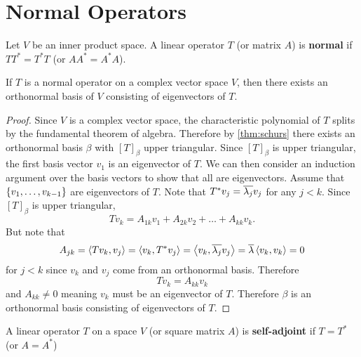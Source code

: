 \documentclass{subfiles}
\begin{document}
\section{Normal Operators}

\begin{definition}
    Let $V$ be an inner product space. A linear operator $T$ (or matrix $A$) is \textbf{normal} if $T T^* = T^* T$ (or $A A^* = A^* A$).
\end{definition}

\begin{theorem}
    If $T$ is a normal operator on a complex vector space $V$, then there exists an orthonormal basis of $V$ consisting of eigenvectors of $T$.
\end{theorem}

\begin{proof}
    Since $V$ is a complex vector space, the characteristic polynomial of $T$ splits by the fundamental theorem of algebra. Therefore by \ref{thm:schurs} there exists an orthonormal basis $\beta$ with $[T]_\beta$ upper triangular. Since $[T]_{\beta}$ is upper triangular, the first basis vector $v_1$ is an eigenvector of $T$. We can then consider an induction argument over the basis vectors to show that all are eigenvectors. Assume that $\qty{v_1, \ldots, v_{k-1}}$ are eigenvectors of $T$. Note that $T^* v_j = \overline{\lambda_j} v_j$ for any $j < k$. Since $[T]_{\beta}$ is upper triangular,
    \[
        T v_k = A_{1k} v_1 + A_{2k} v_2 + \ldots + A_{kk} v_k
    .\]
    But note that
    \[
        A_{jk} = \left\langle T v_k, v_j \right\rangle = \left\langle v_k, T^* v_j \right\rangle = \left\langle v_k, \overline{\lambda_j} v_j \right\rangle = \overline{\lambda} \left\langle v_k, v_k \right\rangle = 0
    \]
    for $j < k$ since $v_k$ and $v_j$ come from an orthonormal basis. Therefore
    \[
        T v_k = A_{kk} v_k
    \]
    and $A_{kk} \neq 0$ meaning $v_k$ must be an eigenvector of $T$. Therefore $\beta$ is an orthonormal basis consisting of eigenvectors of $T$.
\end{proof}

\begin{definition}
    A linear operator $T$ on a space $V$ (or square matrix $A$) is \textbf{self-adjoint} if $T = T^*$ (or $A = A^*$)
\end{definition}
\end{document}

